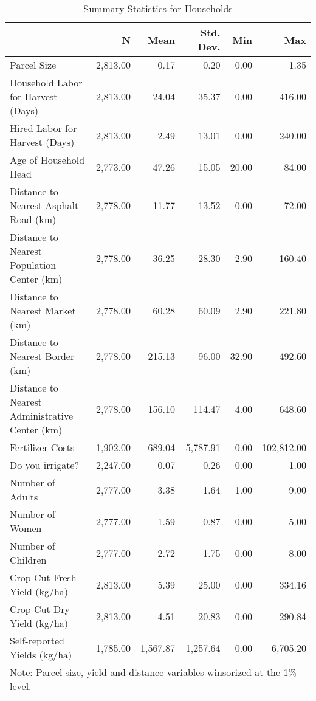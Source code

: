 \begin{table}
\caption{Summary Statistics for Households}
\label{tbl:summary}
\begin{tabular}{lrrrrr}
\toprule
{} & {N} & {Mean} & {Std. Dev.} & {Min} & {Max} \\
\midrule
Parcel Size & 2,813.00 & 0.17 & 0.20 & 0.00 & 1.35 \\
Household Labor for Harvest (Days) & 2,813.00 & 24.04 & 35.37 & 0.00 & 416.00 \\
Hired Labor for Harvest (Days) & 2,813.00 & 2.49 & 13.01 & 0.00 & 240.00 \\
Age of Household Head & 2,773.00 & 47.26 & 15.05 & 20.00 & 84.00 \\
Distance to Nearest Asphalt Road (km) & 2,778.00 & 11.77 & 13.52 & 0.00 & 72.00 \\
Distance to Nearest Population Center (km) & 2,778.00 & 36.25 & 28.30 & 2.90 & 160.40 \\
Distance to Nearest Market (km) & 2,778.00 & 60.28 & 60.09 & 2.90 & 221.80 \\
Distance to Nearest Border (km) & 2,778.00 & 215.13 & 96.00 & 32.90 & 492.60 \\
Distance to Nearest Administrative Center (km) & 2,778.00 & 156.10 & 114.47 & 4.00 & 648.60 \\
Fertilizer Costs & 1,902.00 & 689.04 & 5,787.91 & 0.00 & 102,812.00 \\
Do you irrigate? & 2,247.00 & 0.07 & 0.26 & 0.00 & 1.00 \\
Number of Adults & 2,777.00 & 3.38 & 1.64 & 1.00 & 9.00 \\
Number of Women & 2,777.00 & 1.59 & 0.87 & 0.00 & 5.00 \\
Number of Children & 2,777.00 & 2.72 & 1.75 & 0.00 & 8.00 \\
Crop Cut Fresh Yield (kg/ha) & 2,813.00 & 5.39 & 25.00 & 0.00 & 334.16 \\
Crop Cut Dry Yield (kg/ha) & 2,813.00 & 4.51 & 20.83 & 0.00 & 290.84 \\
Self-reported Yields (kg/ha) & 1,785.00 & 1,567.87 & 1,257.64 & 0.00 & 6,705.20 \\
\bottomrule
\multicolumn{6}{l}{Note: Parcel size, yield and distance variables winsorized at the 1\% level.}
\end{tabular}
\end{table}
